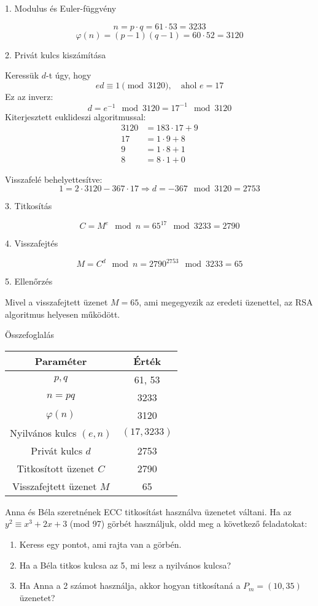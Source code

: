 \begin{solution}
1. Modulus és Euler-függvény

\[
n=p\cdot q=61\cdot53=3233
\]
\[
\varphi(n)=(p-1)(q-1)=60\cdot52=3120
\]

2. Privát kulcs kiszámítása

Keressük $d$-t úgy, hogy 
\[
ed\equiv1\pmod{3120},\quad\text{ahol }e=17
\]
Ez az inverz: 
\[
d=e^{-1}\mod 3120=17^{-1}\mod 3120
\]
Kiterjesztett euklideszi algoritmussal: 
\[
\begin{aligned}3120 & =183\cdot17+9\\
17 & =1\cdot9+8\\
9 & =1\cdot8+1\\
8 & =8\cdot1+0
\end{aligned}
\]

Visszafelé behelyettesítve: 
\[
1=2\cdot3120-367\cdot17\Rightarrow d=-367\mod 3120=2753
\]

3. Titkosítás

\[
C=M^{e}\mod n=65^{17}\mod 3233=2790
\]

4. Visszafejtés

\[
M=C^{d}\mod n=2790^{2753}\mod 3233=65
\]

5. Ellenőrzés

Mivel a visszafejtett üzenet $M=65$, ami megegyezik az eredeti üzenettel,
az RSA algoritmus helyesen működött.

Összefoglalás
\begin{center}
\begin{tabular}{|c|c|}
\hline 
\textbf{Paraméter} & \textbf{Érték}\tabularnewline
\hline 
$p,q$ & 61, 53\tabularnewline
\hline 
$n=pq$ & 3233\tabularnewline
\hline 
$\varphi(n)$ & 3120\tabularnewline
\hline 
Nyilvános kulcs $(e,n)$ & $(17,3233)$\tabularnewline
\hline 
Privát kulcs $d$ & 2753\tabularnewline
\hline 
Titkosított üzenet $C$ & 2790\tabularnewline
\hline 
Visszafejtett üzenet $M$ & 65\tabularnewline
\hline 
\end{tabular}
\par\end{center}
\end{solution}
\begin{extraproblem}
Anna és Béla szeretnének ECC titkosítást használva üzenetet váltani.
Ha az $y^{2}\equiv x^{3}+2x+3$ (mod 97) görbét használjuk, oldd meg
a következő feladatokat: 
\begin{enumerate}
\item Keress egy pontot, ami rajta van a görbén. 
\item Ha a Béla titkos kulcsa az 5, mi lesz a nyilvános kulcsa? 
\item Ha Anna a 2 számot használja, akkor hogyan titkosítaná a $P_{m}=(10,35)$
üzenetet? 
\end{enumerate}
\end{extraproblem}
